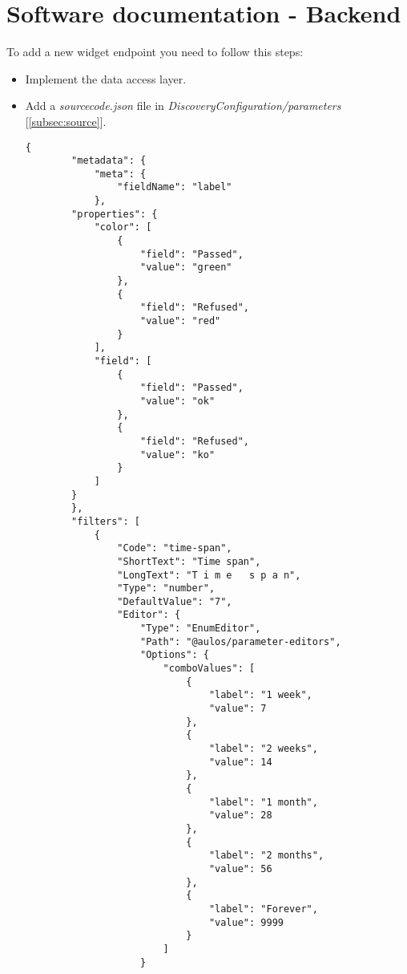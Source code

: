 \section{Software documentation - Backend}
To add a new widget endpoint you need to follow this steps:
\begin{itemize}
    \item Implement the data access layer.
    \item Add a \textit{{sourcecode}.json} file in \textit{DiscoveryConfiguration/parameters} [\ref{subsec:source}].
    \begin{lstlisting}[caption={{sourcecode}.json example}, style=javaScriptCode]
    {
        "metadata": {
            "meta": {
                "fieldName": "label"
            },
        "properties": {
            "color": [
                {
                    "field": "Passed",
                    "value": "green"
                },
                {
                    "field": "Refused",
                    "value": "red"
                }
            ],
            "field": [
                {
                    "field": "Passed",
                    "value": "ok"
                },
                {
                    "field": "Refused",
                    "value": "ko"
                }
            ]
        }
        },
        "filters": [
            {
                "Code": "time-span",
                "ShortText": "Time span",
                "LongText": "T i m e   s p a n",
                "Type": "number",
                "DefaultValue": "7",
                "Editor": {
                    "Type": "EnumEditor",
                    "Path": "@aulos/parameter-editors",
                    "Options": {
                        "comboValues": [
                            {
                                "label": "1 week",
                                "value": 7
                            },
                            {
                                "label": "2 weeks",
                                "value": 14
                            },
                            {
                                "label": "1 month",
                                "value": 28
                            },
                            {
                                "label": "2 months",
                                "value": 56
                            },
                            {
                                "label": "Forever",
                                "value": 9999
                            }
                        ]
                    }

\end{lstlisting}
\end{itemize}
